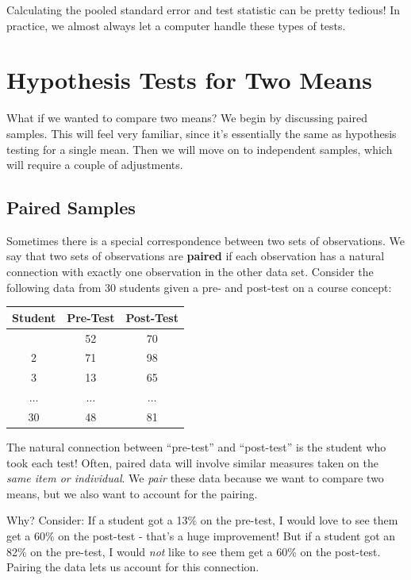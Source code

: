 \documentclass[
]{book}
\begin{document}
Calculating the pooled standard error and test statistic can be pretty tedious! In practice, we almost always let a computer handle these types of tests.

\section{Hypothesis Tests for Two Means}\label{hypothesis-tests-for-two-means}

What if we wanted to compare two means? We begin by discussing paired samples. This will feel very familiar, since it's essentially the same as hypothesis testing for a single mean. Then we will move on to independent samples, which will require a couple of adjustments.

\subsection{Paired Samples}\label{paired-samples}

Sometimes there is a special correspondence between two sets of observations. We say that two sets of observations are \textbf{paired} if each observation has a natural connection with exactly one observation in the other data set. Consider the following data from 30 students given a pre- and post-test on a course concept:

\begin{longtable}[]{@{}ccc@{}}
\toprule\noalign{}
Student & Pre-Test & Post-Test \\
\midrule\noalign{}
\endhead
\bottomrule\noalign{}
\endlastfoot
1 & 52 & 70 \\
2 & 71 & 98 \\
3 & 13 & 65 \\
\(\dots\) & \(\dots\) & \(\dots\) \\
30 & 48 & 81 \\
\end{longtable}

The natural connection between ``pre-test'' and ``post-test'' is the student who took each test! Often, paired data will involve similar measures taken on the \emph{same item or individual}. We \emph{pair} these data because we want to compare two means, but we also want to account for the pairing.

Why? Consider: If a student got a 13\% on the pre-test, I would love to see them get a 60\% on the post-test - that's a huge improvement! But if a student got an 82\% on the pre-test, I would \emph{not} like to see them get a 60\% on the post-test. Pairing the data lets us account for this connection.
\end{document}
